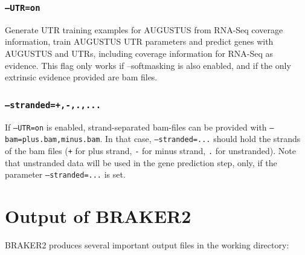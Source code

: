 \documentclass[a4paper,10pt]{report}
\begin{document}
\subsection{\texttt{--UTR=on}} Generate UTR training examples for AUGUSTUS from RNA-Seq coverage information, train AUGUSTUS UTR parameters and predict genes with AUGUSTUS and UTRs, including coverage information for RNA-Seq as evidence. This flag only works if --softmasking is also enabled, and if the only extrinsic evidence provided are bam files.

\subsection{\texttt{--stranded=+,-,.,...}} If \texttt{--UTR=on} is enabled, strand-separated bam-files can be provided with \texttt{--bam=plus.bam,minus.bam}. In that case, \texttt{--stranded=...} should hold the strands of the bam files (\texttt{+} for plus strand, \texttt{-} for minus strand, \texttt{.} for unstranded). Note that unstranded data will be used in the gene prediction step, only, if the parameter \texttt{--stranded=...} is set.

\chapter{Output of BRAKER2}

BRAKER2 produces several important output files in the working directory:
\end{document}
